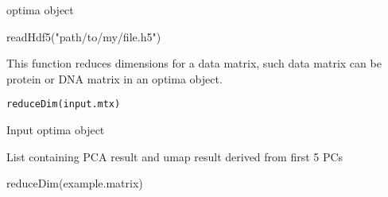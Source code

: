 \documentclass[a4paper]{book}
\begin{document}
%
\begin{Value}
optima object
\end{Value}
%
\begin{Examples}
\begin{ExampleCode}
readHdf5("path/to/my/file.h5")
\end{ExampleCode}
\end{Examples}
%
\begin{Description}\relax
This function reduces dimensions for a data matrix, such data matrix
can be protein or DNA matrix in an optima object.
\end{Description}
%
\begin{Usage}
\begin{verbatim}
reduceDim(input.mtx)
\end{verbatim}
\end{Usage}
%
\begin{Arguments}
\begin{ldescription}
\item[\code{input.mtx}] Input optima object
\end{ldescription}
\end{Arguments}
%
\begin{Value}
List containing PCA result and umap result derived from first 5 PCs
\end{Value}
%
\begin{Examples}
\begin{ExampleCode}
reduceDim(example.matrix)
\end{ExampleCode}
\end{Examples}
\printindex{}
\end{document}
